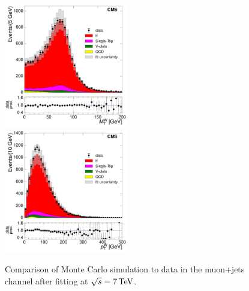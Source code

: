 \begin{figure}[hbtp]
     \includegraphics[width=0.48\textwidth]{Chapters/04_Analysis/04b_XSections/images/control_plots/after_fit/7TeV/MuPlusJets_patType1CorrectedPFMet_MT_2orMoreBtags_with_ratio.pdf}\\     
	 \includegraphics[width=0.48\textwidth]{Chapters/04_Analysis/04b_XSections/images/control_plots/after_fit/7TeV/MuPlusJets_patType1CorrectedPFMet_WPT_2orMoreBtags_with_ratio.pdf}\hfill
	 \caption{Comparison of Monte Carlo simulation to data in the muon+jets channel after fitting at
	 $\sqrt{s}=7\,\text{Te\hspace{-.08em}V}$.}
     \label{fig:data_mc_comparison_after_fit_7TeV_muon}
\end{figure}

